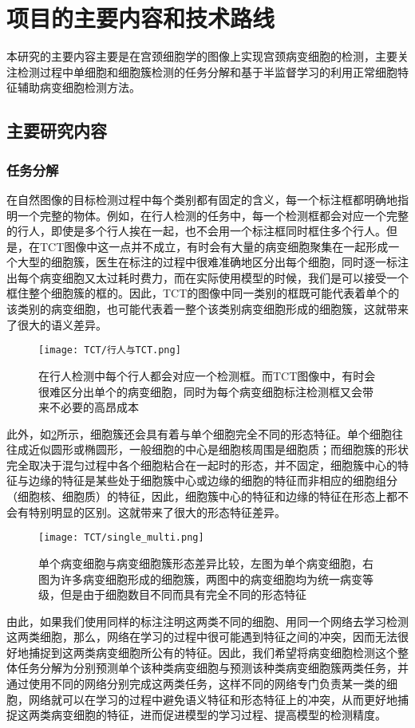 \section{项目的主要内容和技术路线}
\par 本研究的主要内容主要是在宫颈细胞学的图像上实现宫颈病变细胞的检测，主要关注检测过程中单细胞和细胞簇检测的任务分解和基于半监督学习的利用正常细胞特征辅助病变细胞检测方法。

\subsection{主要研究内容}
\subsubsection{任务分解}
\par 在自然图像的目标检测过程中每个类别都有固定的含义，每一个标注框都明确地指明一个完整的物体。例如，在行人检测的任务中，每一个检测框都会对应一个完整的行人，即使是多个行人挨在一起，也不会用一个标注框同时框住多个行人。但是，在TCT图像中这一点并不成立，有时会有大量的病变细胞聚集在一起形成一个大型的细胞簇，医生在标注的过程中很难准确地区分出每个细胞，同时逐一标注出每个病变细胞又太过耗时费力，而在实际使用模型的时候，我们是可以接受一个框住整个细胞簇的框的。因此，TCT的图像中同一类别的框既可能代表着单个的该类别的病变细胞，也可能代表着一整个该类别病变细胞形成的细胞簇，这就带来了很大的语义差异。
\begin{figure}[h]
    \centering
    \texttt{[image: TCT/行人与TCT.png]}
    \caption{在行人检测中每个行人都会对应一个检测框。而TCT图像中，有时会很难区分出单个的病变细胞，同时为每个病变细胞标注检测框又会带来不必要的高昂成本}
    \label{行人与TCT}
\end{figure}
\par 此外，如\ref{单细胞多细胞形态差异}所示，细胞簇还会具有着与单个细胞完全不同的形态特征。单个细胞往往成近似圆形或椭圆形，一般细胞的中心是细胞核周围是细胞质；而细胞簇的形状完全取决于混匀过程中各个细胞粘合在一起时的形态，并不固定，细胞簇中心的特征与边缘的特征是某些处于细胞簇中心或边缘的细胞的特征而非相应的细胞组分（细胞核、细胞质）的特征，因此，细胞簇中心的特征和边缘的特征在形态上都不会有特别明显的区别。这就带来了很大的形态特征差异。
\begin{figure}[h]
    \centering
    \texttt{[image: TCT/single\_multi.png]}
    \caption{单个病变细胞与病变细胞簇形态差异比较，左图为单个病变细胞，右图为许多病变细胞形成的细胞簇，两图中的病变细胞均为统一病变等级，但是由于细胞数目不同而具有完全不同的形态特征}
    \label{单细胞多细胞形态差异}
\end{figure}
\par 由此，如果我们使用同样的标注注明这两类不同的细胞、用同一个网络去学习检测这两类细胞，那么，网络在学习的过程中很可能遇到特征之间的冲突，因而无法很好地捕捉到这两类病变细胞所公有的特征。因此，我们希望将病变细胞检测这个整体任务分解为分别预测单个该种类病变细胞与预测该种类病变细胞簇两类任务，并通过使用不同的网络分别完成这两类任务，这样不同的网络专门负责某一类的细胞，网络就可以在学习的过程中避免语义特征和形态特征上的冲突，从而更好地捕捉这两类病变细胞的特征，进而促进模型的学习过程、提高模型的检测精度。
